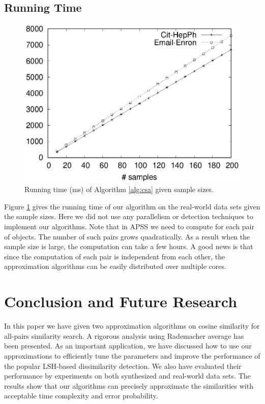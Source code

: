 \documentclass{article}
\begin{document}
\subsection{Running Time}
\begin{figure}[!t]
\centering
\begin{minipage}{.45\textwidth}
\centering
\includegraphics[width=.9\textwidth]{cos_runtime.eps}
\caption{Running time (ms) of Algorithm \ref{alg:csa} given sample sizes.}
\label{fig:run_cos}
\end{minipage}
\end{figure}

Figure \ref{fig:run_cos} gives the running time of our algorithm on the real-world data sets given the sample sizes. Here we did not use any parallelism or detection techniques to implement our algorithms. Note that in APSS we need to compute for each pair of objects. The number of such pairs grows quadratically. As a result when the sample size is large, the computation can take a few hours. A good news is that since the computation of each pair is independent from each other, the approximation algorithms can be easily distributed over multiple cores.

\section{Conclusion and Future Research}
\label{sec:con}
In this paper we have given two approximation algorithms on cosine similarity for all-pairs similarity search. 
A rigorous analysis using Rademacher average has been presented. 
{\color{black}As an important application, we have discussed how to use our approximations to efficiently tune the parameters and improve the performance of the popular LSH-based dissimilarity detection. }
We also have evaluated their performance by experiments on both synthesized and real-world data sets. The results show that our algorithms can precisely approximate the similarities with acceptable time complexity and error probability. 
\end{document}
